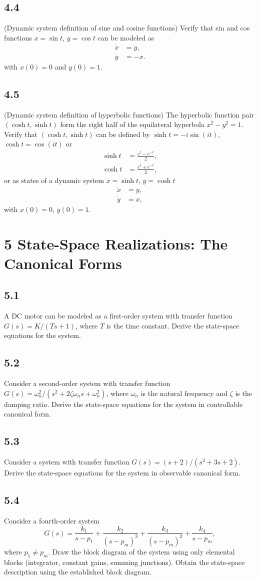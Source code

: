 \documentclass{article}
\newcommand{\problem}[2]{\subsection*{#1}}
\begin{document}
\problem{4.4}{dynamic-definitions}
(Dynamic system definition of sine and cosine functions) Verify that sin and cos functions $x = \sin t$, $y = \cos t$ can be modeled as
\[
\begin{aligned}
\dot{x} &= y, \\
\dot{y} &= -x.
\end{aligned}
\]
with $x(0) = 0$ and $y(0) = 1$.

\problem{4.5}{dynamic-definitions}
(Dynamic system definition of hyperbolic functions) The hyperbolic function pair $(\cosh t, \sinh t)$ form the right half of the equilateral hyperbola $x^2 - y^2 = 1$. Verify that $(\cosh t, \sinh t)$ can be defined by $\sinh t = -i\sin(it)$, $\cosh t = \cos(it)$ or
\[
\begin{aligned}
\sinh t &= \frac{e^t - e^{-t}}{2}, \\
\cosh t &= \frac{e^t + e^{-t}}{2},
\end{aligned}
\]
or as states of a dynamic system $x = \sinh t$, $y = \cosh t$
\[
\begin{aligned}
\dot{x} &= y, \\
\dot{y} &= x,
\end{aligned}
\]
with $x(0) = 0$, $y(0) = 1$.

\section*{5 State-Space Realizations: The Canonical Forms}

\problem{5.1}{canonical-form-drills}
A DC motor can be modeled as a first-order system with transfer function $G(s) = K/(Ts + 1)$, where $T$ is the time constant. Derive the state-space equations for the system.

\problem{5.2}{canonical-form-drills}
Consider a second-order system with transfer function $G(s) = \omega_n^2/(s^2 + 2\zeta\omega_n s + \omega_n^2)$, where $\omega_n$ is the natural frequency and $\zeta$ is the damping ratio. Derive the state-space equations for the system in controllable canonical form.

\problem{5.3}{canonical-form-drills}
Consider a system with transfer function $G(s) = (s + 2)/(s^2 + 3s + 2)$. Derive the state-space equations for the system in observable canonical form.

\problem{5.4}{jordan-form-drills}
Consider a fourth-order system
\[
G(s) = \frac{k_1}{s - p_1} + \frac{k_2}{(s - p_m)^3} + \frac{k_3}{(s - p_m)^2} + \frac{k_4}{s - p_m},
\]
where $p_1 \neq p_m$. Draw the block diagram of the system using only elemental blocks (integrator, constant gains, summing junctions). Obtain the state-space description using the established block diagram.
\end{document}
